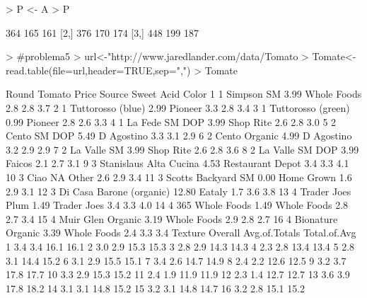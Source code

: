 \documentclass{article}
\begin{document}
\begin{Schunk}
\begin{Sinput}
> P <- A %*% B
> P
\end{Sinput}
\begin{Soutput}
     [,1] [,2] [,3]
[1,]  364  165  161
[2,]  376  170  174
[3,]  448  199  187
\end{Soutput}
\begin{Sinput}
> #problema5
> url<-"http://www.jaredlander.com/data/Tomato%20First.csv"
> Tomate<-read.table(file=url,header=TRUE,sep=",")
> Tomate
\end{Sinput}
\begin{Soutput}
   Round                   Tomato Price           Source Sweet Acid Color
1      1               Simpson SM  3.99      Whole Foods   2.8  2.8   3.7
2      1        Tuttorosso (blue)  2.99          Pioneer   3.3  2.8   3.4
3      1       Tuttorosso (green)  0.99          Pioneer   2.8  2.6   3.3
4      1           La Fede SM DOP  3.99        Shop Rite   2.6  2.8   3.0
5      2             Cento SM DOP  5.49       D Agostino   3.3  3.1   2.9
6      2            Cento Organic  4.99       D Agostino   3.2  2.9   2.9
7      2              La Valle SM  3.99        Shop Rite   2.6  2.8   3.6
8      2          La Valle SM DOP  3.99           Faicos   2.1  2.7   3.1
9      3   Stanislaus Alta Cucina  4.53 Restaurant Depot   3.4  3.3   4.1
10     3                     Ciao    NA            Other   2.6  2.9   3.4
11     3       Scotts Backyard SM  0.00       Home Grown   1.6  2.9   3.1
12     3 Di Casa Barone (organic) 12.80           Eataly   1.7  3.6   3.8
13     4         Trader Joes Plum  1.49      Trader Joes   3.4  3.3   4.0
14     4          365 Whole Foods  1.49      Whole Foods   2.8  2.7   3.4
15     4        Muir Glen Organic  3.19      Whole Foods   2.9  2.8   2.7
16     4        Bionature Organic  3.39      Whole Foods   2.4  3.3   3.4
   Texture Overall Avg.of.Totals Total.of.Avg
1      3.4     3.4          16.1         16.1
2      3.0     2.9          15.3         15.3
3      2.8     2.9          14.3         14.3
4      2.3     2.8          13.4         13.4
5      2.8     3.1          14.4         15.2
6      3.1     2.9          15.5         15.1
7      3.4     2.6          14.7         14.9
8      2.4     2.2          12.6         12.5
9      3.2     3.7          17.8         17.7
10     3.3     2.9          15.3         15.2
11     2.4     1.9          11.9         11.9
12     2.3     1.4          12.7         12.7
13     3.6     3.9          17.8         18.2
14     3.1     3.1          14.8         15.2
15     3.2     3.1          14.8         14.7
16     3.2     2.8          15.1         15.2
\end{Soutput}
\end{Schunk}
\end{document}
